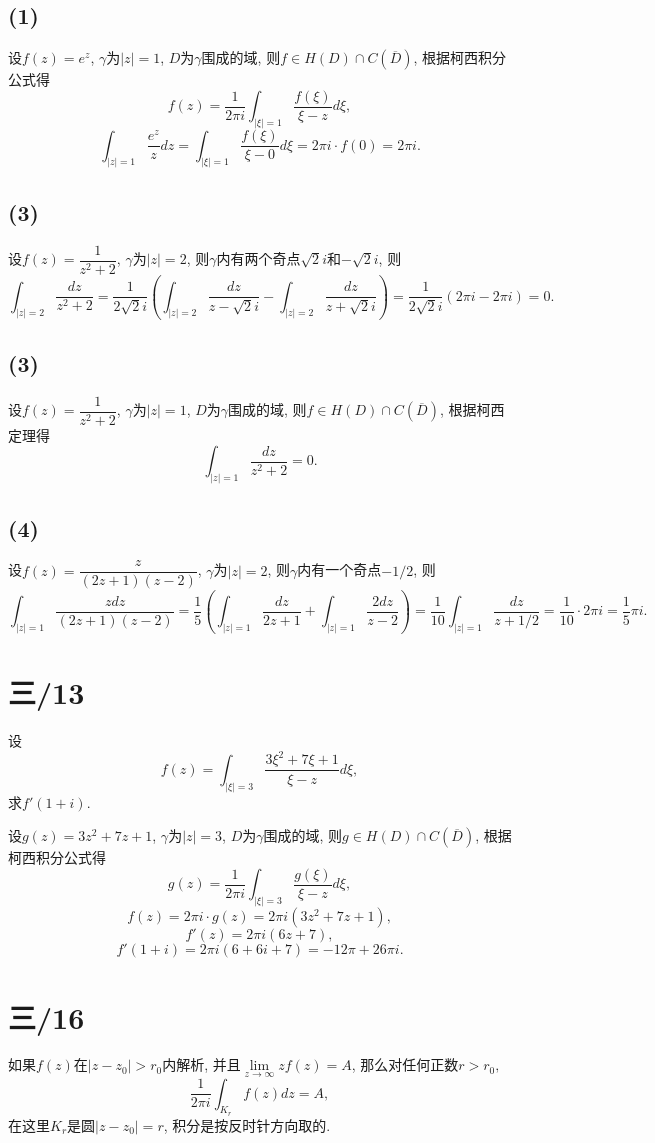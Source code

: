 \documentclass[11pt,a4paper]{article}
\begin{document}
\subsection*{(1)}
设$f(z)=e^z$, $\gamma$为$|z|=1$, $D$为$\gamma$围成的域, 则$f\in H(D)\cap C(\overline{D})$, 根据柯西积分公式得
$$f(z)=\frac{1}{2\pi i}\int_{|\xi|=1}\frac{f(\xi)}{\xi-z}d\xi,$$
$$\int_{|z|=1}\frac{e^z}{z}dz=\int_{|\xi|=1}\frac{f(\xi)}{\xi-0}d\xi=2\pi i\cdot f(0)=2\pi i.$$

\subsection*{(3)}
设$f(z)=\dfrac{1}{z^2+2}$, $\gamma$为$|z|=2$, 则$\gamma$内有两个奇点$\sqrt{2}i$和$-\sqrt{2}i$, 则
$$\int_{|z|=2}\frac{dz}{z^2+2}=\frac{1}{2\sqrt{2}i}\left(\int_{|z|=2}\frac{dz}{z-\sqrt{2}i}-\int_{|z|=2}\frac{dz}{z+\sqrt{2}i}\right)=\frac{1}{2\sqrt{2}i}(2\pi i-2\pi i)=0.$$

\subsection*{(3)}
设$f(z)=\dfrac{1}{z^2+2}$, $\gamma$为$|z|=1$, $D$为$\gamma$围成的域, 则$f\in H(D)\cap C(\overline{D})$, 根据柯西定理得
$$\int_{|z|=1}\frac{dz}{z^2+2}=0.$$

\subsection*{(4)}
设$f(z)=\dfrac{z}{(2z+1)(z-2)}$, $\gamma$为$|z|=2$, 则$\gamma$内有一个奇点$-1/2$, 则
$$\int_{|z|=1}\frac{zdz}{(2z+1)(z-2)}=\frac{1}{5}\left(\int_{|z|=1}\frac{dz}{2z+1}+\int_{|z|=1}\frac{2dz}{z-2}\right)=\frac{1}{10}\int_{|z|=1}\frac{dz}{z+1/2}=\frac{1}{10}\cdot2\pi i=\frac{1}{5}\pi i.$$

\section{三/13}
\begin{problem}
设$$f(z)=\int_{|\xi|=3}\frac{3\xi^2+7\xi+1}{\xi-z}d\xi,$$
求$f'(1+i)$.
\end{problem}

设$g(z)=3z^2+7z+1$, $\gamma$为$|z|=3$, $D$为$\gamma$围成的域, 则$g\in H(D)\cap C(\overline{D})$, 根据柯西积分公式得
$$g(z)=\frac{1}{2\pi i}\int_{|\xi|=3}\frac{g(\xi)}{\xi-z}d\xi,$$
$$f(z)=2\pi i\cdot g(z)=2\pi i(3z^2+7z+1),$$
$$f'(z)=2\pi i(6z+7),$$
$$f'(1+i)=2\pi i(6+6i+7)=-12\pi+26\pi i.$$

\section{三/16}
\begin{problem}
如果$f(z)$在$|z-z_0|>r_0$内解析, 并且$\lim\limits_{z\to\infty}zf(z)=A$, 那么对任何正数$r>r_0,$
$$\frac{1}{2\pi i}\int_{K_r}f(z)dz=A,$$
在这里$K_r$是圆$|z-z_0|=r$, 积分是按反时针方向取的.
\end{problem}
\end{document}

